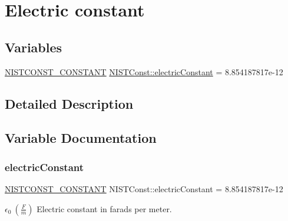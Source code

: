 \hypertarget{group___n_i_s_t_const-_electric_constant}{}\section{Electric constant}
\label{group___n_i_s_t_const-_electric_constant}
\subsection*{Variables}
\begin{DoxyCompactItemize}
\item 
\mbox{\hyperlink{_n_i_s_t_const_8hpp_a2b0fc1d7452373f816175dd86ce26729}{N\+I\+S\+T\+C\+O\+N\+S\+T\+\_\+\+C\+O\+N\+S\+T\+A\+NT}} \mbox{\hyperlink{group___n_i_s_t_const-_electric_constant_ga8c31e3e43f4ddbc5e9d499a58a8b9de1}{N\+I\+S\+T\+Const\+::electric\+Constant}} = 8.\+854187817e-\/12
\end{DoxyCompactItemize}


\subsection{Detailed Description}


\subsection{Variable Documentation}
\mbox{\label{group___n_i_s_t_const-_electric_constant_ga8c31e3e43f4ddbc5e9d499a58a8b9de1}} 
\subsubsection{\texorpdfstring{electric\+Constant}{electricConstant}}
{\footnotesize\ttfamily \mbox{\hyperlink{_n_i_s_t_const_8hpp_a2b0fc1d7452373f816175dd86ce26729}{N\+I\+S\+T\+C\+O\+N\+S\+T\+\_\+\+C\+O\+N\+S\+T\+A\+NT}} N\+I\+S\+T\+Const\+::electric\+Constant = 8.\+854187817e-\/12}

$\epsilon_0 \ (\frac{F}{m})$ Electric constant in farads per meter. 